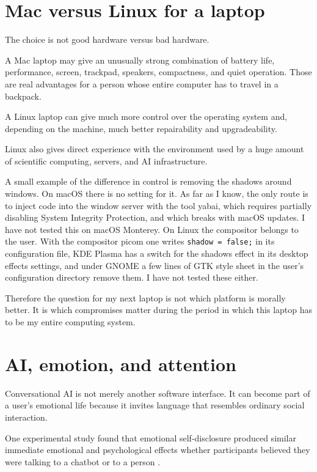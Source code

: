 \section{Mac versus Linux for a laptop}
\label{section-computing-systems-mac-linux}

The choice is not good hardware versus bad
hardware.

A Mac laptop may give an unusually strong
combination of battery life, performance,
screen, trackpad, speakers, compactness,
and quiet operation.  Those are real
advantages for a person whose entire
computer has to travel in a backpack.

A Linux laptop can give much more control
over the operating system and, depending
on the machine, much better repairability
and upgradeability.

Linux also gives direct experience with
the environment used by a huge amount of
scientific computing, servers, and AI
infrastructure.

A small example of the difference in control
is removing the shadows around windows. On
macOS there is no setting for it. As far as
I know, the only route is to inject code
into the window server with the tool yabai,
which requires partially disabling System
Integrity Protection, and which breaks with
macOS updates. I have not tested this on
macOS Monterey. On Linux the compositor
belongs to the user. With the compositor
picom one writes \texttt{shadow = false;}
in its configuration file, KDE Plasma has
a switch for the shadows effect in its
desktop effects settings, and under GNOME
a few lines of GTK style sheet in the user's
configuration directory remove them. I have
not tested these either.

Therefore the question for my next laptop
is not which platform is morally better.
It is which compromises matter during the
period in which this laptop has to be my
entire computing system.

\section{AI, emotion, and attention}
\label{section-ai-emotion-attention}

Conversational AI is not merely another
software interface.  It can become part of
a user's emotional life because it invites
language that resembles ordinary social
interaction.

\medskip\noindent
One experimental study found that emotional
self-disclosure produced similar immediate
emotional and psychological effects whether
participants believed they were talking to
a chatbot or to a person
\cite{ho-hancock-miner-2018}.

